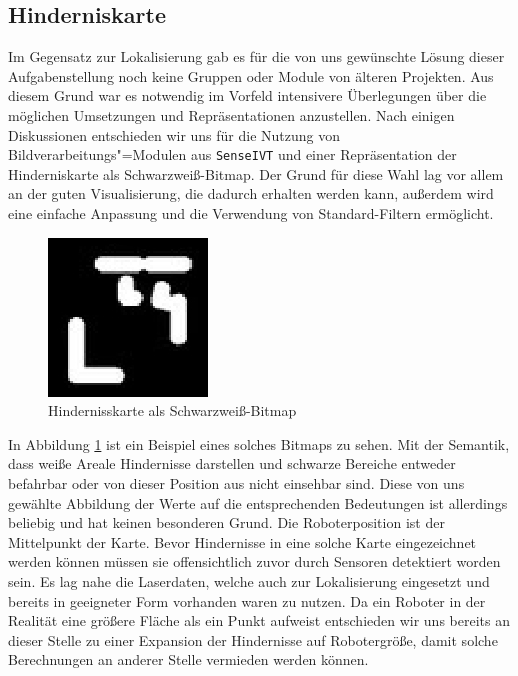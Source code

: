 \subsection{Hinderniskarte}
\label{hinderniskarte_subsec}
\authorsection{\editorandreas}
 Im Gegensatz zur Lokalisierung gab es für die von uns gewünschte Lösung dieser
 Aufgabenstellung noch keine Gruppen oder Module von älteren Projekten. Aus
 diesem Grund war es notwendig im Vorfeld intensivere Überlegungen über die möglichen
 Umsetzungen und Repräsentationen anzustellen.
 Nach einigen Diskussionen entschieden wir uns für die Nutzung von
 Bildverarbeitungs"=Modulen aus \lstinline{SenseIVT}  und
 einer Repräsentation der Hinderniskarte als Schwarzweiß-Bit\-map. Der Grund für
 diese Wahl lag vor allem an der guten Visualisierung, die dadurch erhalten werden kann, außerdem wird eine einfache Anpassung und die Verwendung
 von Standard-Filtern ermöglicht. 
\begin{figure}[h]
\center
\includegraphics[scale=0.7]{graphics/hinderniskarte.jpg}
\caption{\label{fig:hinderniskarte} Hindernisskarte als Schwarzweiß-Bitmap}
\end{figure}
 In Abbildung \ref{fig:hinderniskarte} ist ein Beispiel eines solches Bitmaps
 zu sehen. Mit der Semantik, dass weiße Areale Hindernisse darstellen und schwarze Bereiche entweder befahrbar
 oder von dieser Position aus nicht einsehbar sind. Diese von uns gewählte Abbildung der Werte
 auf die entsprechenden Bedeutungen ist allerdings beliebig und hat keinen besonderen Grund.
 Die Roboterposition ist der Mittelpunkt der Karte. Bevor Hindernisse in eine solche Karte eingezeichnet werden
 können müssen sie offensichtlich zuvor durch Sensoren detektiert worden sein. Es lag nahe die Laserdaten,
 welche auch zur Lokalisierung eingesetzt und bereits in geeigneter Form vorhanden waren zu nutzen.
 Da ein Roboter in der Realität eine größere Fläche als ein Punkt aufweist entschieden wir uns bereits an dieser
 Stelle zu einer Expansion der Hindernisse auf Robotergröße, damit solche Berechnungen an anderer Stelle vermieden
 werden können.
